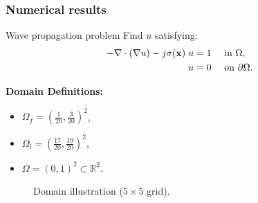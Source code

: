 %
%
%  
 
 \begin{frame}
    \frametitle{Numerical results}
 \begin{block}{Wave propagation problem}
     Find \(u\) satisfying:
    \begin{alignat}{2}
      - \nabla \cdot \left(\nabla u\right) -  j \sigma(\x) \; u   & = 1 &  & \text{ in } \Omega, \\
    						              u   & = 0 &  & \text{ on } {\partial \Omega}.
    \end{alignat}
  \end{block}
  
\begin{multicols}{2}
    \textbf{Domain Definitions:}
    \begin{itemize}
      \item \(\Omega_f = \left(\frac{1}{20}, \frac{3}{20}\right)^{2}\), 
      \item \(\Omega_l = \left(\frac{17}{20}, \frac{19}{20}\right)^{2}\),
      \item \(\Omega = \left(0,1\right)^{2} \subset \mathbb{R}^{2}\).
    \end{itemize}

   \begin{figure}
      \centering
      
      \caption{Domain illustration ($5 \times 5$ grid).}
    \end{figure}

  \end{multicols}
\end{frame}

